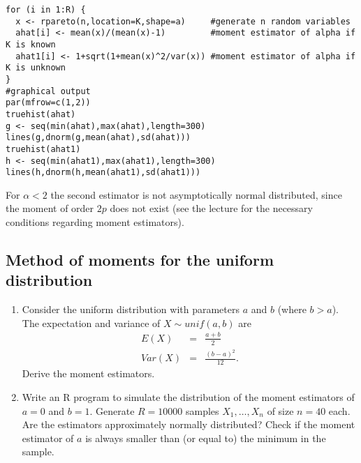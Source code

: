 \documentclass{article}
\begin{document}
\begin{solution}
\begin{enumerate}
\begin{verbatim}
for (i in 1:R) {
  x <- rpareto(n,location=K,shape=a)     #generate n random variables
  ahat[i] <- mean(x)/(mean(x)-1)         #moment estimator of alpha if K is known
  ahat1[i] <- 1+sqrt(1+mean(x)^2/var(x)) #moment estimator of alpha if K is unknown
}
#graphical output
par(mfrow=c(1,2))
truehist(ahat)
g <- seq(min(ahat),max(ahat),length=300)
lines(g,dnorm(g,mean(ahat),sd(ahat)))
truehist(ahat1)
h <- seq(min(ahat1),max(ahat1),length=300)
lines(h,dnorm(h,mean(ahat1),sd(ahat1)))
\end{verbatim}
For $\alpha <2$ the second estimator is not asymptotically normal
distributed, since the moment of order $2p$ does not exist (see the
lecture for the necessary conditions regarding moment estimators).
\end{enumerate}
\end{solution}

\subsection{Method of moments for the uniform distribution}

\begin{enumerate}
\item Consider the uniform distribution with parameters $a$ and $b$ (where $%
b>a$). The expectation and variance of $X\sim unif(a,b)$ are%
\begin{eqnarray*}
E(X) &=&\frac{a+b}{2} \\
Var(X) &=&\frac{\left( b-a\right) ^{2}}{12}.
\end{eqnarray*}%
Derive the moment estimators.

\item Write an R program to simulate the distribution of the moment
estimators of $a=0$ and $b=1$. Generate $R=10000$ samples $X_{1},\ldots
,X_{n}$ of size $n=40$ each. Are the estimators approximately normally
distributed? Check if the moment estimator of $a$ is always smaller than (or
equal to) the minimum in the sample.
\end{enumerate}
\end{document}

